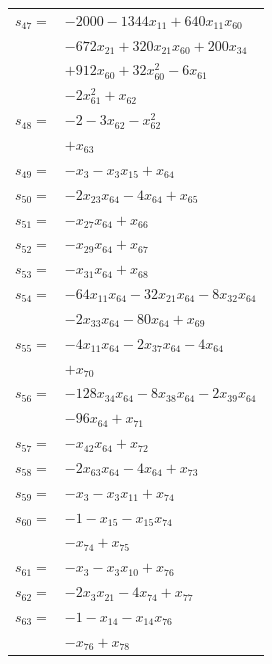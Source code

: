 \begin{longtable}{@{}r@{\;}l@{}}
\(s_{47}=\) & \(\displaystyle -2000 -1344x_{11} +640x_{11}x_{60}\) \\
 & \(\displaystyle -672x_{21} +320x_{21}x_{60} +200x_{34}\) \\
 & \(\displaystyle +912x_{60} +32x_{60}^{2} -6x_{61}\) \\
 & \(\displaystyle -2x_{61}^{2} +x_{62}\) \\[3pt]
\(s_{48}=\) & \(\displaystyle -2 -3x_{62} -x_{62}^{2}\) \\
 & \(\displaystyle +x_{63}\) \\[3pt]
\(s_{49}=\) & \(\displaystyle -x_{3} -x_{3}x_{15} +x_{64}\) \\[3pt]
\(s_{50}=\) & \(\displaystyle -2x_{23}x_{64} -4x_{64} +x_{65}\) \\[3pt]
\(s_{51}=\) & \(\displaystyle -x_{27}x_{64} +x_{66}\) \\[3pt]
\(s_{52}=\) & \(\displaystyle -x_{29}x_{64} +x_{67}\) \\[3pt]
\(s_{53}=\) & \(\displaystyle -x_{31}x_{64} +x_{68}\) \\[3pt]
\(s_{54}=\) & \(\displaystyle -64x_{11}x_{64} -32x_{21}x_{64} -8x_{32}x_{64}\) \\
 & \(\displaystyle -2x_{33}x_{64} -80x_{64} +x_{69}\) \\[3pt]
\(s_{55}=\) & \(\displaystyle -4x_{11}x_{64} -2x_{37}x_{64} -4x_{64}\) \\
 & \(\displaystyle +x_{70}\) \\[3pt]
\(s_{56}=\) & \(\displaystyle -128x_{34}x_{64} -8x_{38}x_{64} -2x_{39}x_{64}\) \\
 & \(\displaystyle -96x_{64} +x_{71}\) \\[3pt]
\(s_{57}=\) & \(\displaystyle -x_{42}x_{64} +x_{72}\) \\[3pt]
\(s_{58}=\) & \(\displaystyle -2x_{63}x_{64} -4x_{64} +x_{73}\) \\[3pt]
\(s_{59}=\) & \(\displaystyle -x_{3} -x_{3}x_{11} +x_{74}\) \\[3pt]
\(s_{60}=\) & \(\displaystyle -1 -x_{15} -x_{15}x_{74}\) \\
 & \(\displaystyle -x_{74} +x_{75}\) \\[3pt]
\(s_{61}=\) & \(\displaystyle -x_{3} -x_{3}x_{10} +x_{76}\) \\[3pt]
\(s_{62}=\) & \(\displaystyle -2x_{3}x_{21} -4x_{74} +x_{77}\) \\[3pt]
\(s_{63}=\) & \(\displaystyle -1 -x_{14} -x_{14}x_{76}\) \\
 & \(\displaystyle -x_{76} +x_{78}\) \\[3pt]

\end{longtable}
